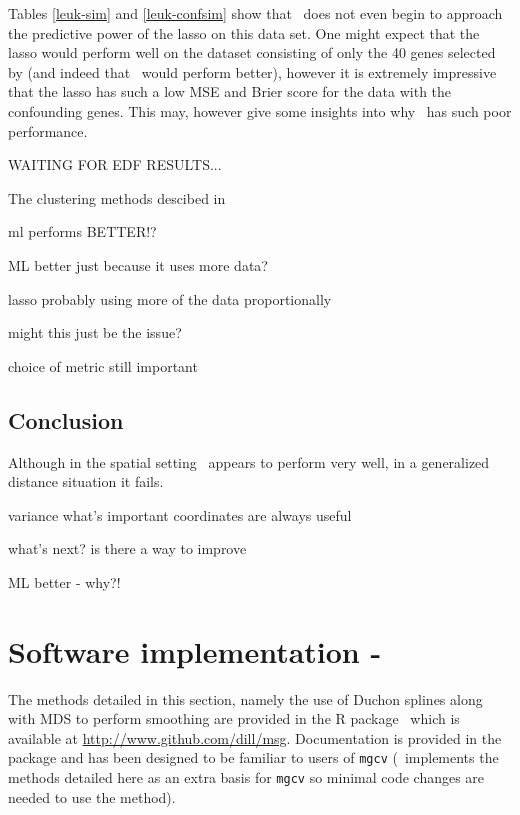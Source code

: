 Tables \ref{leuk-sim} and \ref{leuk-confsim} show that \mdsds\ does not even begin to approach the predictive power of the lasso on this data set. One might expect that the lasso would perform well on the dataset consisting of only the 40 genes selected by  (and indeed that \mdsds\ would perform better), however it is extremely impressive that the lasso has such a low MSE and Brier score for the data with the confounding genes. This may, however give some insights into why \mdsds\ has such poor performance. 


WAITING FOR EDF RESULTS...

The clustering methods descibed in  

ml performs BETTER!?

ML better just because it uses more data?

lasso probably using more of the data proportionally

might this just be the issue?

choice of metric still important



\subsection{Conclusion}

Although in the spatial setting \mdsds\ appears to perform very well, in a generalized distance situation it fails.

   variance
   what's important
   coordinates are always useful


   what's next?
   is there a way to improve

ML better - why?!



\section{Software implementation - \mdspack}
\label{gds-software}

The methods detailed in this section, namely the use of Duchon splines along with MDS to perform smoothing are provided in the \textsf{R} package \mdspack\ which is available at \url{http://www.github.com/dill/msg}. Documentation is provided in the package and has been designed to be familiar to users of \texttt{mgcv} (\mdspack\ implements the methods detailed here as an extra basis for \texttt{mgcv} so minimal code changes are needed to use the method).

